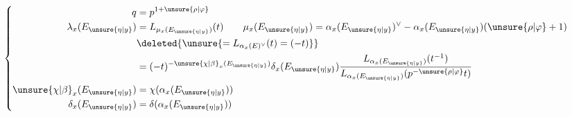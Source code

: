 \[
\left\{\begin{aligned}
q&=p^{1+\unsure{\rho|\varphi}}\\
\lambda_x(E_{\unsure{\eta|y}})&=L_{\mu_x(E_{\unsure{\eta|y}})}(t)\qquad
\mu_x(E_{\unsure{\eta|y}})=\alpha_x(E_{\unsure{\eta|y}})^\vee-\alpha_x(E_{\unsure{\eta|y}})(\unsure{\rho|\varphi}+1)\\
&\deleted{\unsure{=L_{\alpha_x(E)^\vee}(t)=(-t)}}\\
&=(-t)^{-\unsure{\chi|\beta}_x(E_{\unsure{\eta|y}})}\delta_x(E_{\unsure{\eta|y}})\frac{L_{\alpha_x(E_{\unsure{\eta|y}})}(t^{-1})}{L_{\alpha_x(E_{\unsure{\eta|y}})}(p^{-\unsure{\rho|\varphi}}t)}\\
\unsure{\chi|\beta}_x(E_{\unsure{\eta|y}})&=\chi(\alpha_x(E_{\unsure{\eta|y}}))\\
\delta_x(E_{\unsure{\eta|y}})&=\delta(\alpha_x(E_{\unsure{\eta|y}}))
\end{aligned}\right.
\]

